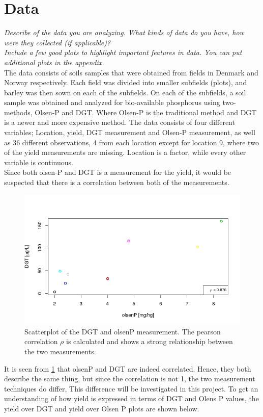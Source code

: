 \documentclass[11pt, fleqn, titlepage]{article}
\begin{document}
\section{Data}
\textit{Describe of the data you are analyzing. What kinds of data do you have, how were they collected (if applicable)? \\ Include a few good plots to highlight important features in data. You can put additional plots in the appendix.}\\
\noindent
The data consists of soils samples that were obtained from fields in Denmark and Norway respectively. Each field was divided into smaller subfields (plots), and barley was then sown on each of the subfields. On each of the subfields, a soil sample was obtained and analyzed for bio-available phosphorus using two-methods, Olsen-P and DGT. Where Olsen-P is the traditional method and DGT is a newer and more expensive method. The data consists of four different variables; Location, yield, DGT measurement and Olsen-P measurement, as well as 36 different observations, 4 from each location except for location 9, where two of the yield measurements are missing. Location is a factor, while every other variable is continuous.
\\ \noindent 
Since both olsen-P and DGT is a measurement for the yield, it would be suspected that there is a correlation between both of the measurements. 
\begin{figure}[H]
	\centering
	\includegraphics[width=0.7\linewidth]{billeder/dgtolsencor.png}
	\caption{Scatterplot of the DGT and olsenP measurement. The pearson correlation $ \rho $ is calculated and shows a strong relationship between the two measurements.}
	\label{fig:dgtolsencor}
\end{figure}
\noindent It is seen from \ref{fig:dgtolsencor} that olsenP and DGT are indeed correlated. Hence, they both describe the same thing, but since the correlation is not 1, the two measurement techniques do differ, This difference will be investigated in this project. To get an understanding of how yield is expressed in terms of DGT and Olens P values, the yield over DGT and yield over Olsen P plots are shown below. 
\end{document}
